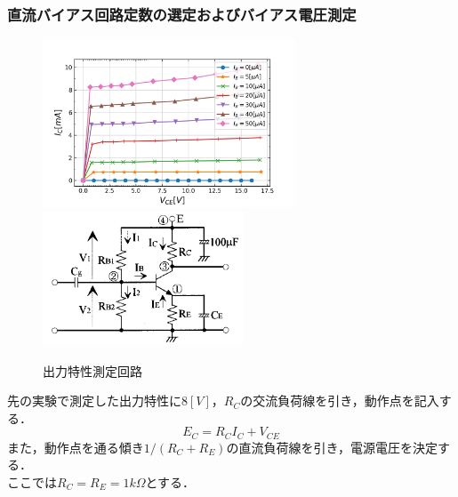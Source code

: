 \documentclass[10pt, a4j, dvipdfmx]{jarticle}
\begin{document}
    \subsubsection{直流バイアス回路定数の選定およびバイアス電圧測定}
    \begin{figure}
        \vspace*{-\intextsep}
        \begin{center}
            \includegraphics[height=50mm]{ex-5.png}
            \includegraphics[height=40mm]{fig-10.png}
            \caption{出力特性測定回路}
        \end{center}
    \end{figure}
    先の実験で測定した出力特性に$8[V]$，$R_C$の交流負荷線を引き，動作点を記入する．\\ 
    \begin{equation}
        E_C = R_C I_C + V_{CE}
    \end{equation}
    また，動作点を通る傾き$1/(R_C + R_E)$の直流負荷線を引き，電源電圧を決定する．\\
    ここでは$R_C = R_E = 1k\Omega$とする．
\end{document}
